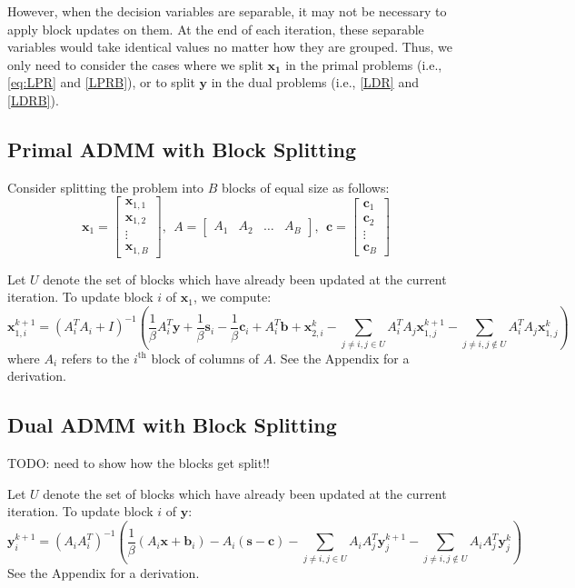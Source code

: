\documentclass{article}
\begin{document}
However, when the decision variables are separable, it may not be necessary to apply block updates on them. At the end of each iteration, these separable variables would take identical values no matter how they are grouped. Thus, we only need to consider the cases where we split $\mathbf{x_1}$ in the primal problems (i.e.,  \eqref{eq:LPR} and \eqref{LPRB}), or to split $\mathbf{y}$ in the dual problems (i.e.,  \eqref{LDR} and \eqref{LDRB}).

\subsection*{Primal ADMM with Block Splitting}

Consider splitting the problem into $B$ blocks of equal size as follows:
\[
\mathbf{x}_{1}=\begin{bmatrix}
\mathbf{x}_{1,1}\\
\mathbf{x}_{1,2}\\
\vdots \\
\mathbf{x}_{1,B}
\end{bmatrix},
 \ \  
A=\begin{bmatrix}A_{1} & A_{2} & \dots & A_{B} \end{bmatrix},
\ \ 
\mathbf{c}=\begin{bmatrix}
\mathbf{c}_{1}\\
\mathbf{c}_{2}\\
\vdots \\
\mathbf{c}_{B}
\end{bmatrix}
\]

Let $U$ denote the set of blocks which have already been updated at the current iteration. To update block $i$ of $\mathbf{x}_{1}$, we compute:
\[
\mathbf{x}_{1,i}^{k+1}=\left(A_{i}^{T}A_{i}+I\right)^{-1}\left(\frac{1}{\beta}A_{i}^{T}\mathbf{y}+\frac{1}{\beta}\mathbf{s}_{i}-\frac{1}{\beta}\mathbf{c}_{i}+A_{i}^{T}\mathbf{b}+\mathbf{x}_{2,i}^{k}-\sum_{j\neq i,j\in U}A_{i}^{T}A_{j}\mathbf{x}_{1,j}^{k+1}-\sum_{j\neq i,j\notin U}A_{i}^{T}A_{j}\mathbf{x}_{1,j}^{k}\right)
\]
where $A_{i}$ refers to the $i^{\text{th}}$ block of columns of $A$. See the Appendix for a derivation.

\subsection*{Dual ADMM with Block Splitting}

TODO: need to show how the blocks get split!!

Let $U$ denote the set of blocks which have already been updated at the current iteration. To update block $i$ of $\mathbf{y}$:
\[
\mathbf{y}_{i}^{k+1}=\left(A_{i}A_{i}^{T}\right)^{-1}\left(\frac{1}{\beta}\left(A_{i}\mathbf{x}+\mathbf{b}_{i}\right)-A_{i}\left(\mathbf{s}-\mathbf{c}\right)-\sum_{j\neq i,j\in U}A_{i}A_{j}^{T}\mathbf{y}_{j}^{k+1}-\sum_{j\neq i,j\notin U}A_{i}A_{j}^{T}\mathbf{y}_{j}^{k}\right)
\]
See the Appendix for a derivation.
\end{document}
